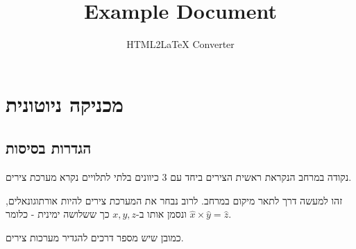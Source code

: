 \documentclass{tstextbook}
\begin{document}
\title{Example Document}
\author{HTML2LaTeX Converter}
\maketitle

\chapter{מכניקה ניוטונית}

\section{הגדרות בסיסות}

\begin{definition}
נקודה במרחב הנקראת ראשית הצירים ביחד עם 3 כיוונים בלתי לתלויים נקרא מערכת צירים.

\end{definition}
זהו למעשה דרך לתאר מיקום במרחב. לרוב נבחר את המערכת צירים להיות אורתוגונאלים, ונסמן אותו ב-\(x,y,z\) כך ששלושה ימינית - כלומר \(\hat{x} \times \hat{y} = \hat{z}\).

כמובן שיש מספר דרכים להגדיר מערכות צירים.
\end{document}

